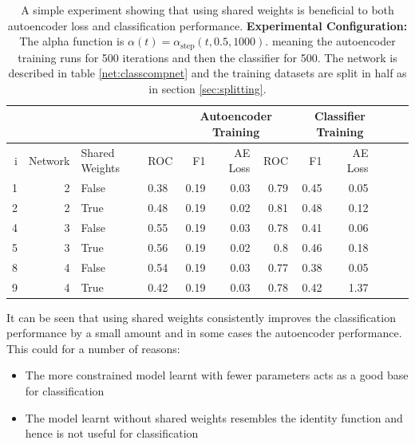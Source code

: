           \begin{table}[!h] \centering
          {\footnotesize
          \begin{tabular}{rrllrrrrrrrr}
            &&&&   \multicolumn{3}{|c|}{Autoencoder Training} &  \multicolumn{3}{c|}{Classifier Training}    \\
          \hline
            i & Network               &   Shared Weights &    ROC&F1&AE Loss & ROC & F1 & AE Loss \\
          \hline
           1 & 2    & False     &    0.38 &   0.19 &     0.03 &    0.79 &   0.45 &     0.05 \\
           2 & 2    & True      &    0.48 &   0.19 &     0.02 &    0.81 &   0.48 &     0.12 \\
          \hline
          4 & 3    & False     &    0.55 &   0.19 &     0.03 &    0.78 &   0.41 &     0.06 \\
          5 & 3    & True      &    0.56 &   0.19 &     0.02 &    0.8  &   0.46 &     0.18 \\
          \hline
          8 & 4     & False     &    0.54 &   0.19 &     0.03 &    0.77 &   0.38 &     0.05 \\
          9 & 4     & True      &    0.42 &   0.19 &     0.03 &    0.78 &   0.42 &     1.37 \\
           \hline
         \end{tabular}}
             \caption{A simple experiment showing that using shared weights is beneficial
             to both autoencoder loss and classification performance. {\bf Experimental Configuration:}
             The alpha function is $\alpha(t)=\alpha_{\text{step}}(t,0.5,1000)$.
             meaning the autoencoder training runs for 500 iterations and then the classifier for 500.
             The network is described in table \ref{net:classcompnet} and the training datasets are split in half as in section
             \ref{sec:splitting}.} \label{tab:sharedweights}
         \end{table}

          It can be seen that using shared weights consistently improves the classification
          performance by a small amount and in some cases the autoencoder performance.
          This could for a number of reasons:
          \begin{itemize}
            \item The more constrained model learnt with fewer parameters acts as a good base for classification
            \item The model learnt without shared weights resembles the identity function and hence is not useful for classification
          \end{itemize}


